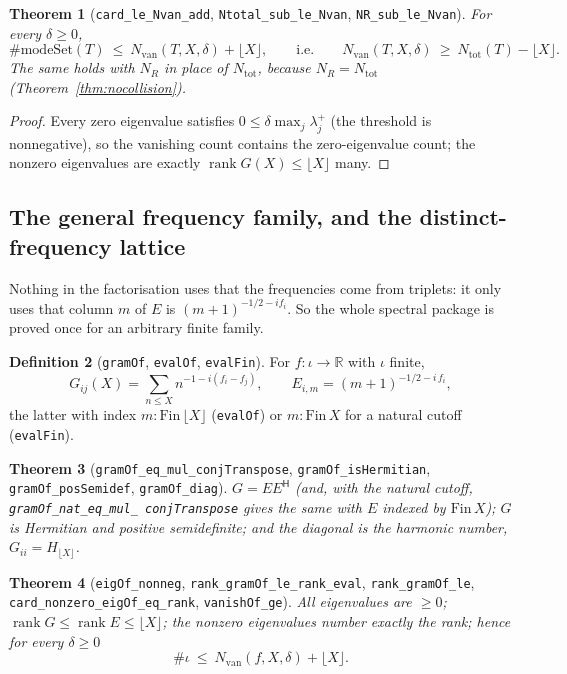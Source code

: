 \documentclass[11pt,a4paper]{article}
\newcommand{\R}{\mathbb{R}}
\newcommand{\lb}{\_\allowbreak}
\newcommand{\code}[1]{\texttt{#1}}
\newtheorem{theorem}{Theorem}[section]
\theoremstyle{definition}
\newtheorem{definition}[theorem]{Definition}
\theoremstyle{remark}
\begin{document}
\begin{theorem}[\code{card\lb le\lb Nvan\lb add}, \code{Ntotal\lb sub\lb le\lb Nvan},
\code{NR\lb sub\lb le\lb Nvan}]\label{thm:Nvanrank}
For every $\delta\ge0$,
\[
  \#\mathrm{modeSet}(T)\ \le\ N_{\mathrm{van}}(T,X,\delta)+\lfloor X\rfloor,
  \qquad\text{i.e.}\qquad
  N_{\mathrm{van}}(T,X,\delta)\ \ge\ N_{\mathrm{tot}}(T)-\lfloor X\rfloor .
\]
The same holds with $N_R$ in place of $N_{\mathrm{tot}}$, because $N_R=N_{\mathrm{tot}}$
(Theorem~\ref{thm:nocollision}).
\end{theorem}
\begin{proof}
Every zero eigenvalue satisfies $0\le\delta\max_j\lambda_j^{+}$ (the threshold is
nonnegative), so the vanishing count contains the zero-eigenvalue count; the nonzero
eigenvalues are exactly $\operatorname{rank}G(X)\le\lfloor X\rfloor$ many.
\end{proof}

\subsection{The general frequency family, and the distinct-frequency lattice}
\label{sec:eigen-general}

Nothing in the factorisation uses that the frequencies come from triplets: it only uses that
column $m$ of $E$ is $(m+1)^{-1/2-i f_i}$.  So the whole spectral package is proved once for an
arbitrary finite family.

\begin{definition}[\code{gramOf}, \code{evalOf}, \code{evalFin}]
For $f:\iota\to\R$ with $\iota$ finite,
\[
  G_{ij}(X)=\sum_{n\le X} n^{-1-i(f_i-f_j)},\qquad
  E_{i,m}=(m+1)^{-1/2-i\,f_i},
\]
the latter with index $m:\mathrm{Fin}\,\lfloor X\rfloor$ (\code{evalOf}) or
$m:\mathrm{Fin}\,X$ for a natural cutoff (\code{evalFin}).
\end{definition}

\begin{theorem}[\code{gramOf\lb eq\lb mul\lb conjTranspose}, \code{gramOf\lb isHermitian},
\code{gramOf\lb posSemidef}, \code{gramOf\lb diag}]
$G=E E^{\mathsf H}$ (and, with the natural cutoff, \code{gramOf\lb nat\lb eq\lb mul\lb
conjTranspose} gives the same with $E$ indexed by $\mathrm{Fin}\,X$); $G$ is Hermitian and
positive semidefinite; and the diagonal is the harmonic number, $G_{ii}=H_{\lfloor X\rfloor}$.
\end{theorem}

\begin{theorem}[\code{eigOf\lb nonneg}, \code{rank\lb gramOf\lb le\lb rank\lb eval},
\code{rank\lb gramOf\lb le}, \code{card\lb nonzero\lb eigOf\lb eq\lb rank},
\code{vanishOf\lb ge}]
All eigenvalues are $\ge0$; $\operatorname{rank}G\le\operatorname{rank}E\le\lfloor X\rfloor$;
the nonzero eigenvalues number exactly the rank; hence for every $\delta\ge0$
\[
  \#\iota\ \le\ N_{\mathrm{van}}(f,X,\delta)+\lfloor X\rfloor .
\]
\end{theorem}
\end{document}
